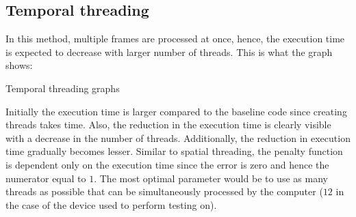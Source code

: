 \documentclass{article}
\begin{document}
\subsection{Temporal threading}
In this method, multiple frames are processed at once, hence, the execution time is expected to decrease with larger number of threads. This is what the graph shows:
\begin{center}
    Temporal threading graphs
\end{center}
Initially the execution time is larger compared to the baseline code since creating threads takes time. Also, the reduction in the execution time is clearly visible with a decrease in the number of threads. Additionally, the reduction in execution time gradually becomes lesser. Similar to spatial threading, the penalty function is dependent only on the execution time since the error is zero and hence the numerator equal to $1$. The most optimal parameter would be to use as many threads as possible that can be simultaneously processed by the computer ($12$ in the case of the device used to perform testing on).
\end{document}
